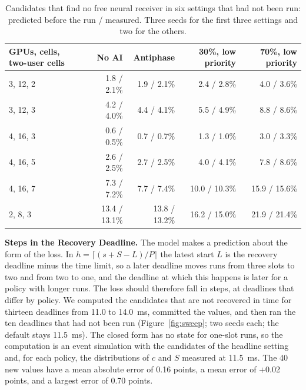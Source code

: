 \documentclass[acmsmall,screen,review,anonymous]{acmart}
\newcommand{\sys}{Antiphase\xspace}
\begin{document}
\begin{table}[t]
\caption{Candidates that find no free neural receiver in six settings that had not been run: predicted
before the run / measured. Three seeds for the first three settings and two for the others.}
\label{tab:prereg}
\footnotesize
\begin{tabular}{@{}lrrrr@{}}
\toprule
GPUs, cells, two-user cells & No AI & \sys & 30\%, low priority & 70\%, low priority \\
\midrule
3, 12, 2 & 1.8 / 2.1\% & 1.9 / 2.1\% & 2.4 / 2.8\% & 4.0 / 3.6\% \\
3, 12, 3 & 4.2 / 4.0\% & 4.4 / 4.1\% & 5.5 / 4.9\% & 8.8 / 8.6\% \\
4, 16, 3 & 0.6 / 0.5\% & 0.7 / 0.7\% & 1.3 / 1.0\% & 3.0 / 3.3\% \\
4, 16, 5 & 2.6 / 2.5\% & 2.7 / 2.5\% & 4.0 / 4.1\% & 7.8 / 8.6\% \\
4, 16, 7 & 7.3 / 7.2\% & 7.7 / 7.4\% & 10.0 / 10.3\% & 15.9 / 15.6\% \\
2, 8, 3 & 13.4 / 13.1\% & 13.8 / 13.2\% & 16.2 / 15.0\% & 21.9 / 21.4\% \\
\bottomrule
\end{tabular}
\end{table}

\noindent\textbf{Steps in the Recovery Deadline.} The model makes a prediction about the form of the loss.
In $h = \lceil (s + S - L)/P \rceil$ the latest start $L$ is the recovery deadline minus the time limit, so
a later deadline moves runs from three slots to two and from two to one, and the deadline at which this
happens is later for a policy with longer runs. The loss should therefore fall in steps, at deadlines that
differ by policy. We computed the candidates that are not recovered in time for thirteen deadlines from
11.0 to 14.0~ms, committed the values, and then ran the ten deadlines that had not been run
(Figure~\ref{fig:sweep}; two seeds each; the default stays 11.5~ms). The closed form has no state for
one-slot runs, so the computation is an event simulation with the candidates of the headline setting and,
for each policy, the distributions of $c$ and $S$ measured at 11.5~ms. The 40 new values have a mean
absolute error of 0.16 points, a mean error of $+$0.02 points, and a largest error of 0.70 points.
\end{document}
